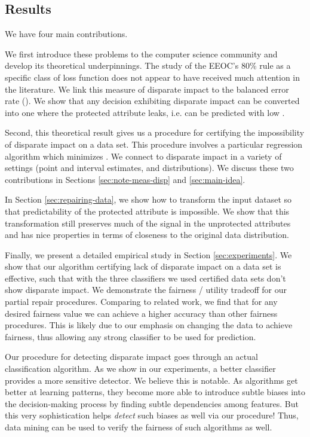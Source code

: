 \subsection{Results}

We have four main contributions.

We first introduce these problems to the computer science community and develop its theoretical underpinnings.  The study of the EEOC's 80\% rule as a specific class of loss function does not appear to have received much attention in the literature.  We link this measure of disparate impact to the balanced error rate (\ber).
We show that any decision exhibiting disparate impact can be converted into one where the protected attribute leaks, i.e. can be predicted with low \ber.

Second, this theoretical result gives us a procedure for certifying the impossibility of disparate impact on a data set.  This procedure involves a particular regression algorithm which minimizes \ber. We connect \ber to disparate impact in a variety of settings (point and interval estimates, and  distributions). We discuss these two contributions in Sections \ref{sec:note-meas-disp} and \ref{sec:main-idea}.

In Section \ref{sec:repairing-data}, we show how to transform the input dataset so that predictability of the protected attribute is impossible. We show that this transformation still preserves much of the signal in the unprotected attributes and has nice properties in terms of closeness to the original data distribution.

Finally, we present a detailed empirical study in Section \ref{sec:experiments}.  We show that our algorithm certifying lack of disparate impact on a data set is effective, such that with the three classifiers we used certified data sets don't show disparate impact.  We demonstrate the fairness / utility tradeoff for our partial repair procedures.  Comparing to related work, we find that for any desired fairness value we can achieve a higher accuracy than other fairness procedures.  This is likely due to our emphasis on changing the data to achieve fairness, thus allowing any strong classifier to be used for prediction.

Our procedure for detecting disparate impact goes through an actual classification algorithm. As we show in our experiments, a better classifier provides a more sensitive detector.
We believe this is notable. As algorithms get better at learning patterns, they become more able to introduce subtle biases into the decision-making process by finding subtle dependencies among features. But this very sophistication helps \emph{detect} such biases as well via our procedure! Thus, data mining can be used to verify the fairness of such algorithms as well.

